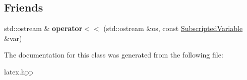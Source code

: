 \subsection*{Friends}
\begin{DoxyCompactItemize}
\item 
\hypertarget{classlatex_1_1math_1_1SubscriptedVariable_a01e65ae2af0e238ef39391dd37bbe33d}{std\-::ostream \& {\bfseries operator$<$$<$} (std\-::ostream \&os, const \hyperlink{classlatex_1_1math_1_1SubscriptedVariable}{Subscripted\-Variable} \&var)}\label{classlatex_1_1math_1_1SubscriptedVariable_a01e65ae2af0e238ef39391dd37bbe33d}

\end{DoxyCompactItemize}


The documentation for this class was generated from the following file\-:\begin{DoxyCompactItemize}
\item 
latex.\-hpp\end{DoxyCompactItemize}

